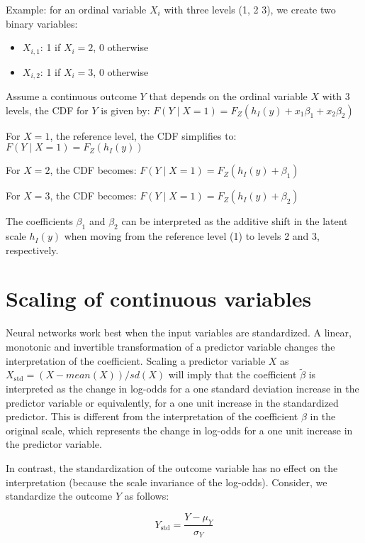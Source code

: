 Example: for an ordinal variable $X_i$ with three levels (1, 2 3), we create two binary variables:

\begin{itemize}
  \item $X_{i,1}$: 1 if $X_i = 2$, 0 otherwise
  \item $X_{i,2}$: 1 if $X_i = 3$, 0 otherwise
\end{itemize}

Assume a continuous outcome $Y$ that depends on the ordinal variable $X$ with 3 levels, the CDF for $Y$ is given by: 
$F(Y \mid X=1) = F_Z(h_I(y) + x_1\beta_1 + x_2\beta_2)$ 

For $X=1$, the reference level, the CDF simplifies to: 
$F(Y \mid X=1) = F_Z(h_I(y))$

For $X=2$, the CDF becomes: $F(Y \mid X=1) = F_Z(h_I(y) + \beta_1)$

For $X=3$, the CDF becomes: $F(Y \mid X=1) = F_Z(h_I(y) + \beta_2)$

The coefficients $\beta_1$ and $\beta_2$ can be interpreted as the additive shift in the latent scale $h_I(y)$ when moving from the reference level (1) to levels 2 and 3, respectively.


\section{Scaling of continuous variables} \label{sec:scaling_continuous_variables}

Neural networks work best when the input variables are standardized. A linear, monotonic and invertible transformation of a predictor variable changes the interpretation of the coefficient. Scaling a predictor variable $X$ as $X_{\text{std}} = (X - mean(X)) / sd(X)$ will imply that the coefficient $\tilde{\beta}$ is interpreted as the change in log-odds for a one standard deviation increase in the predictor variable or equivalently, for a one unit increase in the standardized predictor. This is different from the interpretation of the coefficient $\beta$ in the original scale, which represents the change in log-odds for a one unit increase in the predictor variable.




In contrast, the standardization of the outcome variable has no effect on the interpretation (because the scale invariance of the log-odds). Consider, we standardize the outcome \( Y \) as follows:

\[
Y_{\text{std}} = \frac{Y - \mu_Y}{\sigma_Y}
\]

